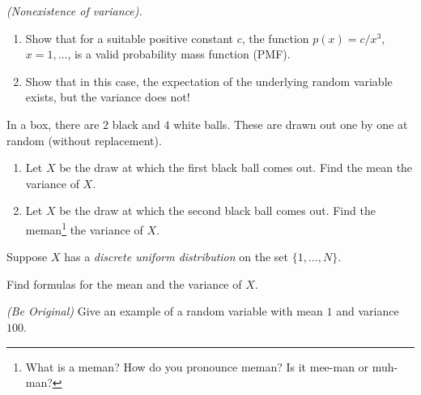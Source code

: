 \begin{problem}[Handout 7, \# 8]
  \emph{(Nonexistence of variance).}
  \begin{enumerate}[label=(\alph*),noitemsep]
  \item Show that for a suitable positive constant \(c\), the function
    \(p(x)=c/x^3\), \(x=1,\dots\), is a valid probability mass function
    (PMF).
  \item Show that in this case, the expectation of the underlying random
    variable exists, but the variance does not!
  \end{enumerate}

\end{problem}
\begin{solution}

\end{solution}
\newpage

\begin{problem}[Handout 7, \# 9]
  In a box, there are \(2\) black and \(4\) white balls. These are drawn
  out one by one at random (without replacement).
  \begin{enumerate}[label=(\alph*),noitemsep]
  \item Let \(X\) be the draw at which the first black ball comes out. Find
    the mean the variance of \(X\).
  \item Let \(X\) be the draw at which the second black ball comes
    out. Find the meman\footnote{What is a meman? How do you pronounce
      meman? Is it mee-man or muh-man?} the variance of \(X\).
  \end{enumerate}
\end{problem}
\begin{solution}

\end{solution}
\newpage

\begin{problem}[Handout 7, \# 10]
  Suppose \(X\) has a \emph{discrete uniform distribution} on the set
  \(\{1,\dotsc,N\}\).

  Find formulas for the mean and the variance of \(X\).
\end{problem}
\begin{solution}

\end{solution}
\newpage

\begin{problem}[Handout 7, \# 11]
  \emph{(Be Original)} Give an example of a random variable with mean
  \(1\) and variance \(100\).
\end{problem}
\begin{solution}

\end{solution}
\newpage

